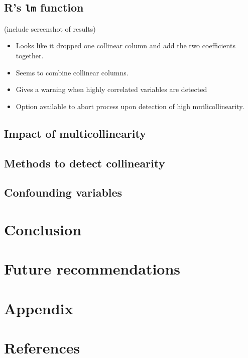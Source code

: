 \documentclass[12pt]{article}
\begin{document}
	\subsection{R's \texttt{lm} function}
	(include screenshot of results)
	
	\begin{itemize}
		\item Looks like it dropped one collinear column and add the two coefficients together.
		\item Seems to combine collinear columns.
		\item Gives a warning when highly correlated variables are detected
		\item Option available to abort process upon detection of high mutlicollinearity.
	\end{itemize}
	
	\subsection{Impact of multicollinearity}
	\subsection{Methods to detect collinearity}
	\subsection{Confounding variables}
	
	\section{Conclusion}
	\section{Future recommendations}
	\section{Appendix}
	
	\section{References}
	
\end{document}
